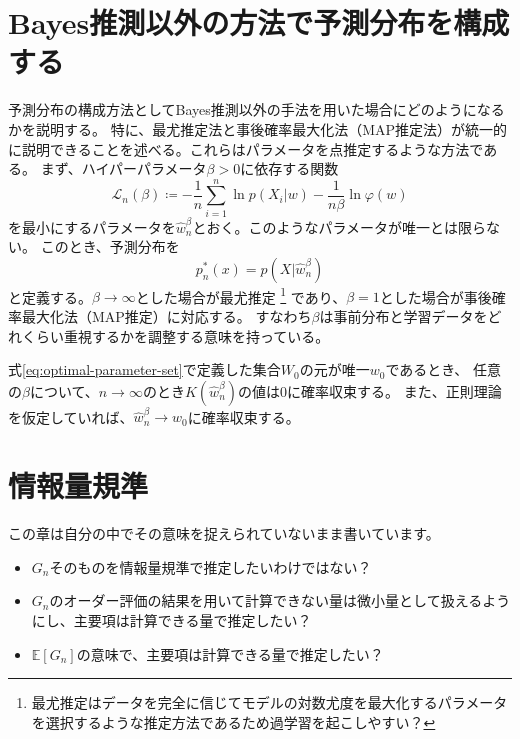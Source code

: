 \documentclass[dvipdfmx]{jsarticle}
\begin{document}
\newpage

\section{Bayes推測以外の方法で予測分布を構成する}
予測分布の構成方法としてBayes推測以外の手法を用いた場合にどのようになるかを説明する。
特に、最尤推定法と事後確率最大化法（MAP推定法）が統一的に説明できることを述べる。これらはパラメータを点推定するような方法である。
まず、ハイパーパラメータ$\beta>0$に依存する関数
\begin{equation}
    \mathcal{L}_n(\beta) \coloneqq -\frac{1}{n}\sum_{i=1}^{n}\ln{p(X_i|w)} - \frac{1}{n\beta}\ln{\varphi(w)}
\end{equation}
を最小にするパラメータを$\hat{w}^{\beta}_{n}$とおく。このようなパラメータが唯一とは限らない。
このとき、予測分布を
\begin{equation}
    p_n^{*}(x) = p(X|\hat{w}^{\beta}_{n})
\end{equation}
と定義する。$\beta\to\infty$とした場合が最尤推定
\footnote{
    最尤推定はデータを完全に信じてモデルの対数尤度を最大化するパラメータを選択するような推定方法であるため過学習を起こしやすい？
}
であり、$\beta=1$とした場合が事後確率最大化法（MAP推定）に対応する。
すなわち$\beta$は事前分布と学習データをどれくらい重視するかを調整する意味を持っている。


\begin{mybox}[推定量の一致性]
    式\eqref{eq:optimal-parameter-set}で定義した集合$W_0$の元が唯一$w_0$であるとき、
    任意の$\beta$について、$n\to\infty$のとき$K(\hat{w}_n^{\beta})$の値は$0$に確率収束する。
    また、正則理論を仮定していれば、$\hat{w}_n^{\beta}\to w_0$に確率収束する。
\end{mybox}





\newpage

\section{情報量規準}
この章は自分の中でその意味を捉えられていないまま書いています。
\begin{itemize}
    \item $G_n$そのものを情報量規準で推定したいわけではない？
    \item $G_n$のオーダー評価の結果を用いて計算できない量は微小量として扱えるようにし、主要項は計算できる量で推定したい？
    \item $\mathbb{E}[G_n]$の意味で、主要項は計算できる量で推定したい？
\end{itemize}
\end{document}
